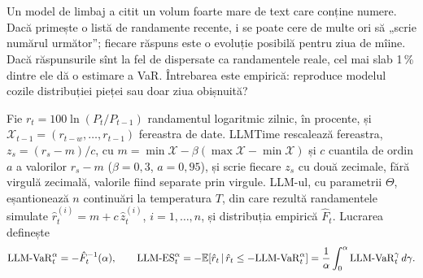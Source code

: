 \section{}
\begin{intuition}
%
{Un model de limbaj a citit un volum foarte mare de text care conține numere. Dacă primește o listă de randamente recente, i se poate cere de multe ori să „scrie numărul următor”; fiecare răspuns este o evoluție posibilă pentru ziua de mîine.
Dacă răspunsurile sînt la fel de dispersate ca randamentele reale, cel mai slab 1\,\% dintre ele dă o estimare a VaR. Întrebarea este empirică: reproduce modelul cozile distribuției pieței sau doar ziua obișnuită?}
\end{intuition}
%
{Fie $r_t=100\ln(P_t/P_{t-1})$ randamentul logaritmic zilnic, în procente, și $\mathcal X_{t-1}=(r_{t-w},\dots,r_{t-1})$ fereastra de date. LLMTime rescalează fereastra, $z_s=(r_s-m)/c$, cu $m=\min\mathcal X-\beta(\max\mathcal X-\min\mathcal X)$ și $c$ cuantila de ordin $a$ a valorilor $r_s-m$ ($\beta=0{,}3$, $a=0{,}95$), și scrie fiecare $z_s$ cu două zecimale, fără virgulă zecimală, valorile fiind separate prin virgule.
LLM-ul, cu parametrii $\Theta$, eșantionează $n$ continuări la temperatura $T$, din care rezultă randamentele simulate $\hat r^{(i)}_t=m+c\,\hat z^{(i)}_t$, $i=1,\dots,n$, și distribuția empirică $\hat F_t$. Lucrarea definește}
\[
\mathrm{LLM\text{-}VaR}^{\alpha}_t=-\hat F_t^{-1}(\alpha),\qquad
\mathrm{LLM\text{-}ES}^{\alpha}_t=-\mathbb{E}\!\left[\hat r_t\,\middle|\,\hat r_t\le-\mathrm{LLM\text{-}VaR}^{\alpha}_t\right]=\frac1\alpha\int_0^\alpha \mathrm{LLM\text{-}VaR}^{\gamma}_t\,d\gamma .
\]
